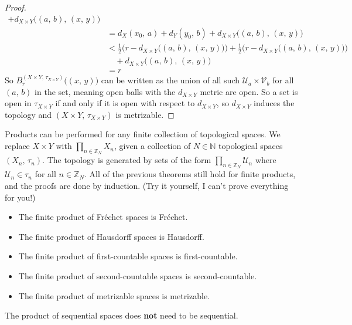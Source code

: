 \documentclass{article}
\theoremstyle{plain}
\theoremstyle{normal}
\begin{document}
\begin{proof}
\begin{align}
                    +d_{X\times{Y}}\big((a,\,b),\,(x,\,y)\big)\\
                &={d}_{X}(x_{0},\,a)+d_{Y}(y_{0},\,b)+
                    d_{X\times{Y}}\big((a,\,b),\,(x,\,y)\big)\\
                &<\frac{1}{2}\Big(
                    r-d_{X\times{Y}}\big((a,\,b),\,(x,\,y)\big)
                \Big)+\frac{1}{2}\Big(
                    r-d_{X\times{Y}}\big((a,\,b),\,(x,\,y)\big)
                \Big)\nonumber\\
                &\quad+d_{X\times{Y}}\big((a,\,b),\,(x,\,y)\big)\\
                &=r
            \end{align}
            So $B_{r}^{(X\times{Y},\,\tau_{X\times{Y}})}\big((x,\,y)\big)$
            can be written as the union of all such
            $\mathcal{U}_{a}\times\mathcal{V}_{b}$ for all
            $(a,\,b)$ in the set, meaning open balls with the
            $d_{X\times{Y}}$ metric are open. So a set is open in
            $\tau_{X\times{Y}}$ if and only if it is open with respect to
            $d_{X\times{Y}}$, so $d_{X\times{Y}}$ induces the topology and
            $(X\times{Y},\,\tau_{X\times{Y}})$ is metrizable.
        \end{proof}
        Products can be performed for any finite collection of topological
        spaces. We replace $X\times{Y}$ with
        $\prod_{n\in\mathbb{Z}_{N}}X_{n}$, given a collection of
        $N\in\mathbb{N}$ topological spaces $(X_{n},\,\tau_{n})$. The
        topology is generated by sets of the form
        $\prod_{n\in\mathbb{Z}_{N}}\mathcal{U}_{n}$ where
        $\mathcal{U}_{n}\in\tau_{n}$ for all $n\in\mathbb{Z}_{N}$. All of the
        previous theorems still hold for finite products, and the proofs are
        done by induction. (Try it yourself, I can't prove everything for you!)
        \begin{itemize}
            \item The finite product of Fr\'{e}chet spaces is Fr\'{e}chet.
            \item The finite product of Hausdorff spaces is Hausdorff.
            \item The finite product of first-countable spaces is
                first-countable.
            \item The finite product of second-countable spaces is
                second-countable.
            \item The finite product of metrizable spaces is metrizable.
        \end{itemize}
        The product of sequential spaces does \textbf{not} need to be
        sequential.
\end{document}
